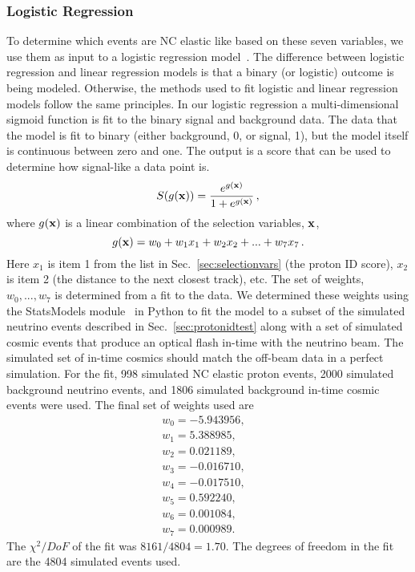   \subsubsection{Logistic Regression}
    To determine which events are NC elastic like based on these seven
    variables, we use them as input to a logistic regression
    model~\cite{Hosmer2005}. The difference between logistic regression and
    linear regression models is that a binary (or logistic) outcome is being
    modeled.  Otherwise, the methods used to fit logistic and linear regression
    models follow the same principles. In our logistic regression a
    multi-dimensional sigmoid function is fit to the binary signal and
    background data.  The data that the model is fit to binary (either
    background, 0, or signal, 1), but the model itself is continuous between
    zero and one.  The output is a score that can be used to determine how
    signal-like a data point is.
    \begin{equation*}
      S(g({\bf x})) = \frac{e^{g({\bf x})}}{1 + e^{g({\bf x})}} \,,
    \end{equation*}
    where $g({\bf x})$ is a linear combination of the selection variables, ${\bf x}$,
    \begin{equation*}
      g({\bf x}) = w_0 + w_1 x_1 + w_2 x_2 + ... + w_7 x_7 \,.
    \end{equation*}
    Here $x_1$ is item 1 from the list in Sec.~\ref{sec:selectionvars} (the
    proton ID score), $x_2$ is item 2 (the distance to the next closest track),
    etc. The set of weights, $w_0,...,w_7$ is determined from a fit to the
    data. We determined these weights using the StatsModels
    module~\cite{pystats} in Python to fit the model to a subset of the
    simulated neutrino events described in Sec.~\ref{sec:protonidtest} along
    with a set of simulated cosmic events that produce an optical flash in-time
    with the neutrino beam. The simulated set of in-time cosmics should match
    the off-beam data in a perfect simulation. For the fit, 998 simulated NC
    elastic proton events, 2000 simulated background neutrino events, and 1806
    simulated background in-time cosmic events were used. The final set of
    weights used are
    \begin{equation}
      \begin{aligned}
        w_0 = -5.943956,& \\
        w_1 =  5.388985,& \\
        w_2 =  0.021189,& \\
        w_3 = -0.016710,& \\
        w_4 = -0.017510,& \\
        w_5 =  0.592240,& \\
        w_6 =  0.001084,& \\
        w_7 =  0.000989.&
      \end{aligned}
    \end{equation}
    The $\chi^2/DoF$ of the fit was $8161/4804 = 1.70$. The degrees of freedom
    in the fit are the 4804 simulated events used.
    
